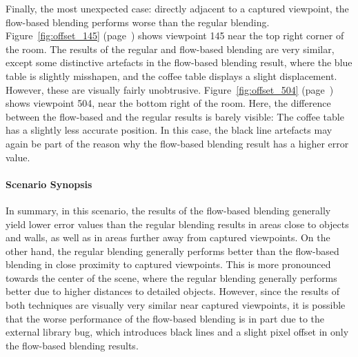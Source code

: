 Finally, the most unexpected case: directly adjacent to a captured viewpoint, the flow-based blending performs worse than the regular blending. Figure~\ref{fig:offset_145} (page~\pageref{fig:offset_145}) shows viewpoint 145 near the top right corner of the room. The results of the regular and flow-based blending are very similar, except some distinctive artefacts in the flow-based blending result, where the blue table is slightly misshapen, and the coffee table displays a slight displacement. However, these are visually fairly unobtrusive.
Figure~\ref{fig:offset_504} (page~\pageref{fig:offset_504}) shows viewpoint 504, near the bottom right of the room. Here, the difference between the flow-based and the regular results is barely visible: The coffee table has a slightly less accurate position. In this case, the black line artefacts may again be part of the reason why the flow-based blending result has a higher error value.


\paragraph{Scenario Synopsis}
In summary, in this scenario, the results of the flow-based blending generally yield lower error values than the regular blending results in areas close to objects and walls, as well as in areas further away from captured viewpoints.
On the other hand, the regular blending generally performs better than the flow-based blending in close proximity to captured viewpoints. This is more pronounced towards the center of the scene, where the regular blending generally performs better due to higher distances to detailed objects. However, since the results of both techniques are visually very similar near captured viewpoints, it is possible that the worse performance of the flow-based blending is in part due to the external library bug, which introduces black lines and a slight pixel offset in only the flow-based blending results.

